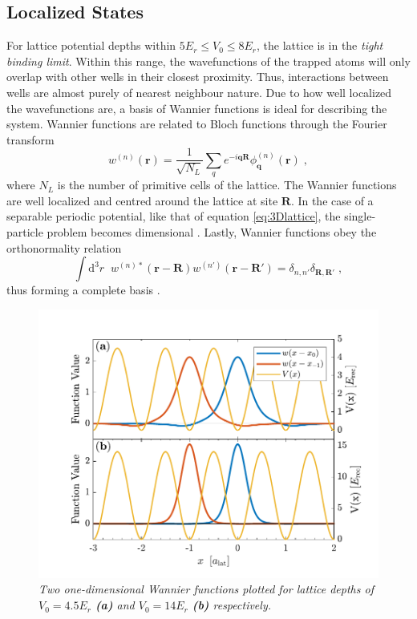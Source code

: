 \subsection{Localized States}
For lattice potential depths within $5 E_r \leq V_0 \leq 8 E_r$, the lattice is in the \textit{tight binding limit}. Within this range, the wavefunctions of the trapped atoms will only overlap with other wells in their closest proximity. Thus, interactions between wells are almost purely of nearest neighbour nature. Due to how well localized the wavefunctions are, a basis of Wannier functions is ideal for describing the system. Wannier functions are related to Bloch functions through the Fourier transform \cite{kittel1963}
\begin{equation}
	w^{(n)}(\boldsymbol{r}) = \frac{1}{\sqrt{N_L}} \sum_{q} e^{ -i \boldsymbol{q} \boldsymbol{R} } \phi_{\boldsymbol{q}}^{(n)}(\boldsymbol{r}) \; ,
\end{equation} 
where $N_L$ is the number of primitive cells of the lattice. The Wannier functions are well localized and centred around the lattice at site $\boldsymbol{R}$. In the case of a separable periodic potential, like that of equation \eqref{eq:3Dlattice}, the single-particle problem becomes dimensional \cite{kohn1959analyticWannier}. Lastly, Wannier functions obey the orthonormality relation
\begin{equation}
	\int \mathrm{d^3}r \; \; w^{(n) *}(\boldsymbol{r} - \boldsymbol{R}) w^{(n')}(\boldsymbol{r} - \boldsymbol{R'}) = \delta_{n,n'} \delta_{\boldsymbol{R},\boldsymbol{R}'} \; ,
\end{equation}
thus forming a complete basis \cite{manybodyBloch}. 
\begin{figure}[!h]
	\centering
	\includegraphics[width=0.8\columnwidth]{Figures/WannierFunctions.pdf} 
	\caption{\textit{Two one-dimensional Wannier functions plotted for lattice depths of $V_0 = 4.5 E_r$ \textbf{(a)} and $V_0 = 14 E_r$ \textbf{(b)} respectively.}}
	\label{fig:WannierPlot} 
\end{figure}
